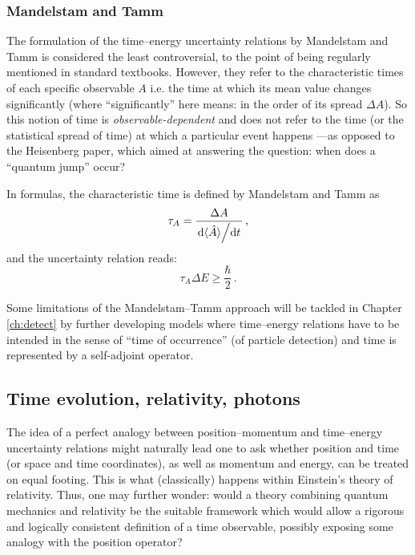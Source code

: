 \subsubsection{Mandelstam and Tamm}

The formulation of the time--energy uncertainty relations by Mandelstam and Tamm
\parencite{MandelstamTamm} is considered the least controversial, to the point
of being regularly mentioned in standard textbooks. However,
they refer to the characteristic times of each specific observable $A$ i.e.
the time at which its mean value changes significantly (where ``significantly''
here means: in the order of its spread $\Delta{A}$). So this notion of time
is \emph{observable-dependent} and does not refer to the time (or the statistical spread of time)
at which a particular event happens
---as opposed to the Heisenberg paper, which aimed at answering the question: when does
a ``quantum jump'' occur?

In formulas, the characteristic time is defined by Mandelstam and Tamm as
\begin{equation}
  \tau_{A} = \frac{ \Delta{A} } { \dv*{\langle\hat{A}\rangle}{t} } \, \text{,}
\end{equation}
and the uncertainty relation reads:
\begin{equation}
  \tau_{A}\Delta{E} \ge \frac{\hbar}{2} \, \text{.}
\end{equation}

Some limitations of the Mandelstam--Tamm
approach
will be tackled
in
Chapter \ref{ch:detect}
by further developing
models where time--energy relations have to be intended in the sense
of ``time of occurrence'' (of particle detection)
and time is represented
by a self-adjoint operator.

% 

\subsection{Time evolution, relativity, photons}\label{sec:trel}

The idea of a perfect analogy between
position--momentum and time--energy uncertainty relations
might naturally lead one to ask whether position and time
(or space and time coordinates), as well as momentum and energy, can be treated on
equal footing. This is what (classically) happens within Einstein's theory of relativity.
Thus, one may further wonder:
would a theory combining quantum mechanics and
relativity be the suitable framework which would allow a rigorous and logically consistent
definition of a time observable,
possibly exposing some analogy with the position operator?

